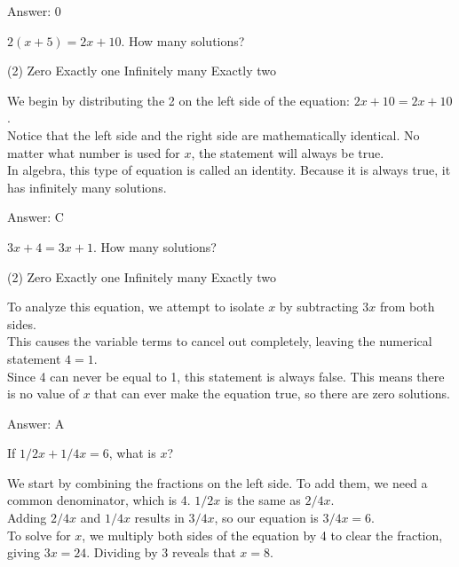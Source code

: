 \documentclass[11pt,paper=a4,answers]{exam}
\begin{document}
\begin{questions}
\begin{solution}
\vspace{20pt}
Answer: \colorbox{yellow!100}{0}
\end{solution}
\question
$2(x + 5) = 2x + 10$. How many solutions?
\begin{tasks}(2)
    \task Zero
    \task Exactly one
    \task Infinitely many
    \task Exactly two
\end{tasks}

\begin{solution}
We begin by distributing the 2 on the left side of the equation: $2x + 10 = 2x + 10$. 
\\[10pt]
Notice that the left side and the right side are mathematically identical. No matter what number is used for $x$, the statement will always be true. 
\\[10pt]
In algebra, this type of equation is called an identity. Because it is always true, it has infinitely many solutions.

\vspace{15pt}
Answer: \colorbox{yellow!100}{C}
\end{solution}

\question
$3x + 4 = 3x + 1$. How many solutions?
\begin{tasks}(2)
    \task Zero
    \task Exactly one
    \task Infinitely many
    \task Exactly two
\end{tasks}

\begin{solution}
To analyze this equation, we attempt to isolate $x$ by subtracting $3x$ from both sides. 
\\[10pt]
This causes the variable terms to cancel out completely, leaving the numerical statement $4 = 1$. 
\\[10pt]
Since 4 can never be equal to 1, this statement is always false. This means there is no value of $x$ that can ever make the equation true, so there are zero solutions.

\vspace{15pt}
Answer: \colorbox{yellow!100}{A}
\end{solution}

\question
If $1/2 x + 1/4 x = 6$, what is $x$?

\begin{solution}
We start by combining the fractions on the left side. To add them, we need a common denominator, which is 4. $1/2 x$ is the same as $2/4 x$. 
\\[10pt]
Adding $2/4 x$ and $1/4 x$ results in $3/4 x$, so our equation is $3/4 x = 6$. 
\\[10pt]
To solve for $x$, we multiply both sides of the equation by 4 to clear the fraction, giving $3x = 24$. Dividing by 3 reveals that $x = 8$.


\end{solution}
\end{questions}
\end{document}
